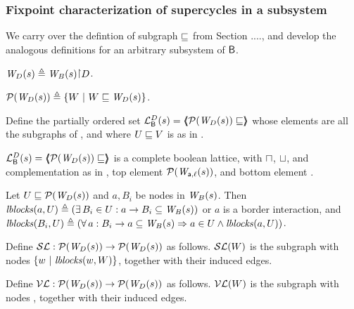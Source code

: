 
\subsubsection{Fixpoint characterization of supercycles in a  subsystem}

We carry over the defintion of subgraph $\subg$ from Section ...., and develop the analogous definitions for an arbitrary subsystem of $\B$.

 \label{defn:projWgraph}
$\lwfg{B}{s}{\DS} \df \wfg{B}{s} \pj \DS$.
\ed

 \label{defn:wsetOfSubgraphs}
$\lwfgS{B}{s}{\DS} \df  \set{ W \stt W \subg \lwfg{B}{s}{\DS} }$.
\ed

 \label{defn:wflattice}
Define the partially ordered set 
$\llat{\B}{s}{\DS}  = \tpl{ \lwfgS{B}{s}{\DS}  \subg }$ 
whose elements are all the subgraphs of 
, and where  $U \subg V$ is as in .   
\ed


\bp \label{prop:isALatticeLoc}
$\llat{\B}{s}{\DS}  = \tpl{ \lwfgS{B}{s}{\DS}  \subg }$
 is a complete boolean lattice, with $\meet$, $\join$, and complementation as in 
, top element $\lwfgS{B}{s}{\act,\l}$, and bottom element \ewfg.
\ep


\bd \label{defn:blocksLoc}
Let $U \subg \lwfgS{B}{s}{\DS}$ and $a, B_i$ be nodes in $\wfg{B}{s}$. Then 
$\lblocks{a}{U} \df (\ex B_i \in U : a \ar B_i \sub \wfg{B}{s})$ or $a$ is a border interaction, and 
$\lblocks{B_i}{U} \df (\fa a : B_i \ar a \sub\wfg{B}{s} \imp a \in U \land \lblocks{a}{U})$.
\ed



\bd \label{defn:scFixL}
Define $\lSFs:  \lwfgS{B}{s}{\DS}  \to  \lwfgS{B}{s}{\DS}$ as follows.
$\lSF{W}$ is the subgraph with nodes $\set{w \stt \lblocks{w}{W} }$, together with their induced edges.
\ed


\bd \label{defn:violFixL}
Define $\lVFs: \lwfgS{B}{s}{\DS}  \to  \lwfgS{B}{s}{\DS}$ as follows.
$\lVF{W}$ is the subgraph with nodes , together with their induced edges.
\ed


